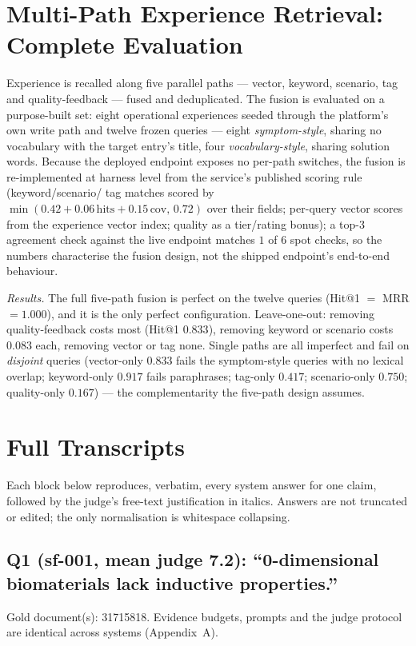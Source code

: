 \documentclass[sigconf, review, anonymous]{acmart}
\begin{document}
\section{Multi-Path Experience Retrieval: Complete Evaluation}\label{app:multipath}
Experience is recalled along five parallel paths --- vector, keyword,
scenario, tag and quality-feedback --- fused and deduplicated. The fusion is
evaluated on a purpose-built set: eight operational experiences seeded
through the platform's own write path and twelve frozen queries --- eight
\emph{symptom-style}, sharing no vocabulary with the target entry's title,
four \emph{vocabulary-style}, sharing solution words. Because the deployed
endpoint exposes no per-path switches, the fusion is re-implemented at
harness level from the service's published scoring rule (keyword/scenario/
tag matches scored by $\min(0.42 + 0.06\,\mathrm{hits} +
0.15\,\mathrm{cov},\,0.72)$ over their fields; per-query vector scores from
the experience vector index; quality as a tier/rating bonus); a top-3
agreement check against the live endpoint matches $1$ of $6$ spot checks, so
the numbers characterise the fusion design, not the shipped endpoint's
end-to-end behaviour.

\emph{Results.} The full five-path fusion is perfect on the twelve queries
(Hit@1 $=$ MRR $= 1.000$), and it is the only perfect configuration.
Leave-one-out: removing quality-feedback costs most (Hit@1 $0.833$), removing
keyword or scenario costs $0.083$ each, removing vector or tag none. Single
paths are all imperfect and fail on \emph{disjoint} queries (vector-only
$0.833$ fails the symptom-style queries with no lexical overlap; keyword-only
$0.917$ fails paraphrases; tag-only $0.417$; scenario-only $0.750$;
quality-only $0.167$) --- the complementarity the five-path design assumes.

\section{Full Transcripts}\label{app:transcripts}
Each block below reproduces, verbatim, every system answer for one claim,
followed by the judge's free-text justification in italics. Answers are not
truncated or edited; the only normalisation is whitespace collapsing.

\subsection{Q1 (sf-001, mean judge 7.2): ``0-dimensional biomaterials lack inductive properties.''}
\label{app:q1}
\noindent Gold document(s): 31715818. Evidence budgets, prompts and the judge protocol are identical across systems (Appendix~A).
\end{document}
